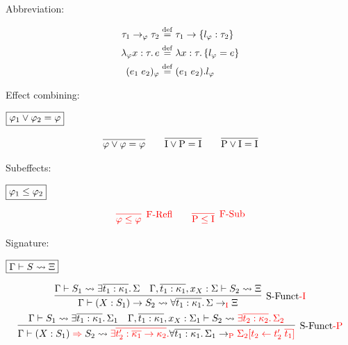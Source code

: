 Abbreviation:

\begin{align*}
  \tau_1 \to_\varphi \tau_2 &\mathrel{\overset{\mathrm{def}}{=}} \tau_1 \to \{l_\varphi: \tau_2\} \\
  \lambda_\varphi x: \tau\ldotp e &\mathrel{\overset{\mathrm{def}}{=}} \lambda x: \tau\ldotp \{l_\varphi = e\} \\
  (e_1\; e_2)_\varphi &\mathrel{\overset{\mathrm{def}}{=}} (e_1\; e_2).l_\varphi
\end{align*}

Effect combining:

$\fbox{$\varphi_1 \lor \varphi_2 = \varphi$}$

\begin{gather*}
  \infer{\varphi \lor \varphi = \varphi}{}
  \hspace{2em}
  \infer{\symI \lor \symP = \symI}{}
  \hspace{2em}
  \infer{\symP \lor \symI = \symI}{}
\end{gather*}

Subeffects:

$\fbox{$\varphi_1 \leq \varphi_2$}$

\begin{gather*}
  \textcolor{red}{
  \infer[\text{F-Refl}]{\varphi \leq \varphi}{}
  \hspace{2em}
  \infer[\text{F-Sub}]{\symP \leq \symI}{}
  }
\end{gather*}

Signature:

$\fbox{$\Gamma \vdash S \rightsquigarrow \Xi$}$

\begin{gather*}
  \infer[\text{S-Funct\textcolor{red}{-I}}]{\Gamma \vdash (X: S_1) \to S_2 \elaborate \forall \overline{t_1: \kappa_1}\ldotp \Sigma \to_{\textcolor{red}{\symI}} \Xi}{
    \Gamma \vdash S_1 \elaborate \exists \overline{t_1: \kappa_1}\ldotp \Sigma
    &
    \Gamma, \overline{t_1: \kappa_1}, x_X: \Sigma \vdash S_2 \elaborate \Xi
  }
  \\
  \infer[\text{S-Funct\textcolor{red}{-P}}]{\Gamma \vdash (X: S_1) \mathrel{\textcolor{red}{\Rightarrow}} S_2 \elaborate \textcolor{red}{\exists \overline{t_2': \overline{\kappa_1} \to \kappa_2}\ldotp} \forall \overline{t_1: \kappa_1}\ldotp \Sigma_1 \to_{\textcolor{red}{\symP}} \textcolor{red}{\Sigma_2[t_2 \assign t_2'\; \overline{t_1}]}}{
    \Gamma \vdash S_1 \elaborate \exists \overline{t_1: \kappa_1}\ldotp \Sigma_1
    &
    \Gamma, \overline{t_1: \kappa_1}, x_X: \Sigma_1 \vdash S_2 \elaborate \textcolor{red}{\exists \overline{t_2: \kappa_2}\ldotp \Sigma_2}
  }
\end{gather*}


